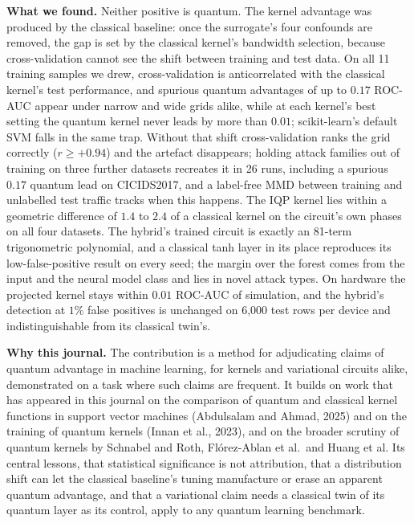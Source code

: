 \documentclass[11pt,a4paper]{article}
\begin{document}
\textbf{What we found.} Neither positive is quantum. The kernel advantage was produced by the classical
baseline: once the surrogate's four confounds are removed, the gap is set by the classical kernel's bandwidth
selection, because cross-validation cannot see the shift between training and test data. On all 11
training samples we drew, cross-validation is anticorrelated with the classical kernel's test
performance, and spurious quantum advantages of up to $0.17$ ROC-AUC appear under narrow and wide grids
alike, while at each kernel's best setting the quantum kernel never leads by more than $0.01$;
scikit-learn's default SVM falls in the same trap. Without that shift
cross-validation ranks the grid correctly ($r\ge+0.94$) and the artefact disappears; holding attack
families out of training on three further datasets recreates it in 26 runs, including a spurious $0.17$
quantum lead on CICIDS2017, and a label-free MMD between training and unlabelled test traffic tracks when this
happens. The IQP kernel lies within a geometric difference of $1.4$ to $2.4$ of a classical kernel on the
circuit's own phases on all four datasets. The hybrid's trained circuit is exactly an 81-term
trigonometric polynomial, and a classical tanh layer in its place reproduces its low-false-positive
result on every seed; the margin over the forest comes from the input and the neural model class and
lies in novel attack types. On hardware the projected kernel stays within $0.01$ ROC-AUC of simulation,
and the hybrid's detection at $1\%$ false positives is unchanged on 6{,}000 test rows per device and
indistinguishable from its classical twin's.

\textbf{Why this journal.} The contribution is a method for adjudicating claims of quantum advantage in machine learning, for
kernels and variational circuits alike, demonstrated on a task where such claims are frequent. It builds on work that has appeared
in this journal on the comparison of quantum and classical kernel functions in support vector machines
(Abdulsalam and Ahmad, 2025) and on the training of quantum kernels (Innan et al., 2023), and on the
broader scrutiny of quantum kernels by Schnabel and Roth, Fl\'orez-Ablan et al.\ and Huang et al. Its
central lessons, that statistical significance is not attribution, that a distribution shift can let
the classical baseline's tuning manufacture or erase an apparent quantum advantage, and that a
variational claim needs a classical twin of its quantum layer as its control, apply to any quantum
learning benchmark.
\end{document}
